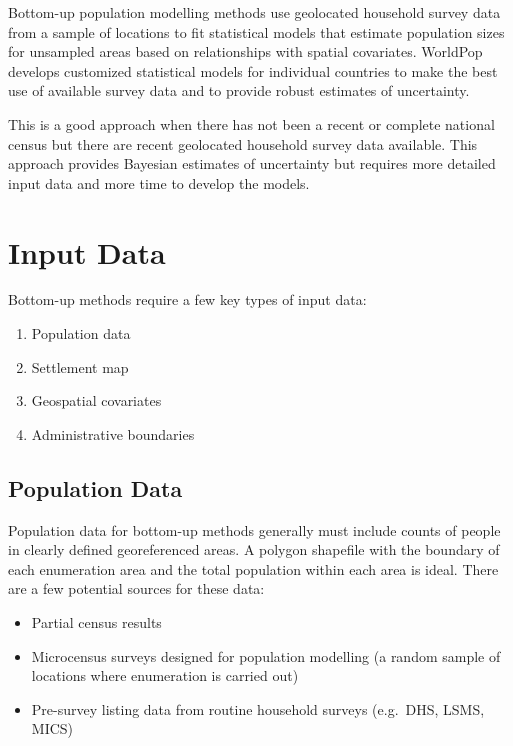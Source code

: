 \documentclass[]{book}
\providecommand{\tightlist}{%
  \setlength{\itemsep}{0pt}\setlength{\parskip}{0pt}}
\begin{document}
Bottom-up population modelling methods
\citep{wardrop2018spatially, leasure2020national} use geolocated
household survey data from a sample of locations to fit statistical
models that estimate population sizes for unsampled areas based on
relationships with spatial covariates. WorldPop develops customized
statistical models for individual countries to make the best use of
available survey data and to provide robust estimates of uncertainty.

This is a good approach when there has not been a recent or complete
national census but there are recent geolocated household survey data
available. This approach provides Bayesian estimates of uncertainty but
requires more detailed input data and more time to develop the models.

\section{Input Data}\label{input-data}

Bottom-up methods require a few key types of input data:

\begin{enumerate}
\def\labelenumi{\arabic{enumi}.}
\tightlist
\item
  Population data\\
\item
  Settlement map\\
\item
  Geospatial covariates\\
\item
  Administrative boundaries
\end{enumerate}

\subsection{Population Data}\label{population-data}

Population data for bottom-up methods generally must include counts of
people in clearly defined georeferenced areas. A polygon shapefile with
the boundary of each enumeration area and the total population within
each area is ideal. There are a few potential sources for these data:

\begin{itemize}
\tightlist
\item
  Partial census results\\
\item
  Microcensus surveys designed for population modelling (a random sample
  of locations where enumeration is carried out)\\
\item
  Pre-survey listing data from routine household surveys (e.g.~DHS,
  LSMS, MICS)
\end{itemize}
\end{document}
